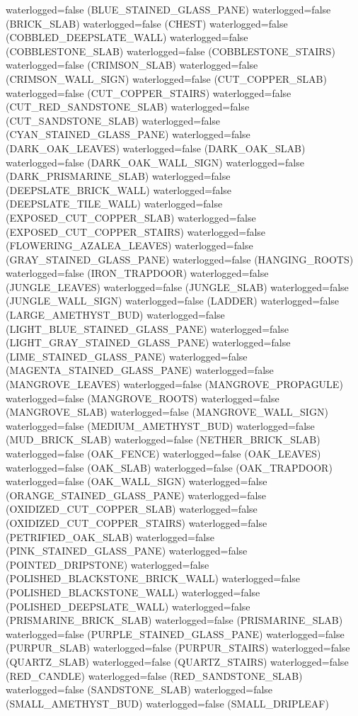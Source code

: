\documentclass[11pt]{article}
\begin{document}
waterlogged=false (BLUE_STAINED_GLASS_PANE)
waterlogged=false (BRICK_SLAB)
waterlogged=false (CHEST)
waterlogged=false (COBBLED_DEEPSLATE_WALL)
waterlogged=false (COBBLESTONE_SLAB)
waterlogged=false (COBBLESTONE_STAIRS)
waterlogged=false (CRIMSON_SLAB)
waterlogged=false (CRIMSON_WALL_SIGN)
waterlogged=false (CUT_COPPER_SLAB)
waterlogged=false (CUT_COPPER_STAIRS)
waterlogged=false (CUT_RED_SANDSTONE_SLAB)
waterlogged=false (CUT_SANDSTONE_SLAB)
waterlogged=false (CYAN_STAINED_GLASS_PANE)
waterlogged=false (DARK_OAK_LEAVES)
waterlogged=false (DARK_OAK_SLAB)
waterlogged=false (DARK_OAK_WALL_SIGN)
waterlogged=false (DARK_PRISMARINE_SLAB)
waterlogged=false (DEEPSLATE_BRICK_WALL)
waterlogged=false (DEEPSLATE_TILE_WALL)
waterlogged=false (EXPOSED_CUT_COPPER_SLAB)
waterlogged=false (EXPOSED_CUT_COPPER_STAIRS)
waterlogged=false (FLOWERING_AZALEA_LEAVES)
waterlogged=false (GRAY_STAINED_GLASS_PANE)
waterlogged=false (HANGING_ROOTS)
waterlogged=false (IRON_TRAPDOOR)
waterlogged=false (JUNGLE_LEAVES)
waterlogged=false (JUNGLE_SLAB)
waterlogged=false (JUNGLE_WALL_SIGN)
waterlogged=false (LADDER)
waterlogged=false (LARGE_AMETHYST_BUD)
waterlogged=false (LIGHT_BLUE_STAINED_GLASS_PANE)
waterlogged=false (LIGHT_GRAY_STAINED_GLASS_PANE)
waterlogged=false (LIME_STAINED_GLASS_PANE)
waterlogged=false (MAGENTA_STAINED_GLASS_PANE)
waterlogged=false (MANGROVE_LEAVES)
waterlogged=false (MANGROVE_PROPAGULE)
waterlogged=false (MANGROVE_ROOTS)
waterlogged=false (MANGROVE_SLAB)
waterlogged=false (MANGROVE_WALL_SIGN)
waterlogged=false (MEDIUM_AMETHYST_BUD)
waterlogged=false (MUD_BRICK_SLAB)
waterlogged=false (NETHER_BRICK_SLAB)
waterlogged=false (OAK_FENCE)
waterlogged=false (OAK_LEAVES)
waterlogged=false (OAK_SLAB)
waterlogged=false (OAK_TRAPDOOR)
waterlogged=false (OAK_WALL_SIGN)
waterlogged=false (ORANGE_STAINED_GLASS_PANE)
waterlogged=false (OXIDIZED_CUT_COPPER_SLAB)
waterlogged=false (OXIDIZED_CUT_COPPER_STAIRS)
waterlogged=false (PETRIFIED_OAK_SLAB)
waterlogged=false (PINK_STAINED_GLASS_PANE)
waterlogged=false (POINTED_DRIPSTONE)
waterlogged=false (POLISHED_BLACKSTONE_BRICK_WALL)
waterlogged=false (POLISHED_BLACKSTONE_WALL)
waterlogged=false (POLISHED_DEEPSLATE_WALL)
waterlogged=false (PRISMARINE_BRICK_SLAB)
waterlogged=false (PRISMARINE_SLAB)
waterlogged=false (PURPLE_STAINED_GLASS_PANE)
waterlogged=false (PURPUR_SLAB)
waterlogged=false (PURPUR_STAIRS)
waterlogged=false (QUARTZ_SLAB)
waterlogged=false (QUARTZ_STAIRS)
waterlogged=false (RED_CANDLE)
waterlogged=false (RED_SANDSTONE_SLAB)
waterlogged=false (SANDSTONE_SLAB)
waterlogged=false (SMALL_AMETHYST_BUD)
waterlogged=false (SMALL_DRIPLEAF)
\end{document}
